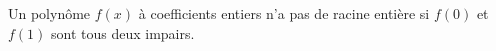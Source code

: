 Un polynôme $f(x)$ à coefficients entiers n'a pas de racine entière si $f(0)$ et $f(1)$ sont tous deux impairs.
